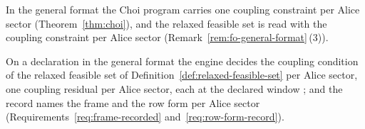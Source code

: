 
In the general format the Choi program carries one coupling constraint per
Alice sector (Theorem~\ref{thm:choi}), and the relaxed feasible set is read
with the coupling constraint per Alice sector
(Remark~\ref{rem:fo-general-format}\,(3)).

\begin{requirement}\label{req:per-sector-coupling}
On a declaration in the general format the engine decides the coupling
condition of the relaxed feasible set of
Definition~\ref{def:relaxed-feasible-set} per Alice sector, one coupling
residual per Alice sector, each at the declared window
; and the record names the frame and the row form
per Alice sector (Requirements~\ref{req:frame-recorded}
and~\ref{req:row-form-record}).
\end{requirement}

